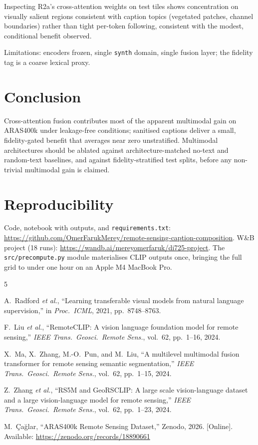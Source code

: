 \documentclass[conference]{IEEEtran}
\begin{document}
Inspecting R2a's cross-attention weights on test tiles shows
concentration on visually salient regions consistent with caption topics
(vegetated patches, channel boundaries) rather than tight per-token
following, consistent with the modest, conditional benefit observed.

Limitations: encoders frozen, single \texttt{synth} domain, single fusion
layer; the fidelity tag is a coarse lexical proxy.

\section{Conclusion}

Cross-attention fusion contributes most of the apparent multimodal gain
on ARAS400k under leakage-free conditions; sanitised captions deliver a
small, fidelity-gated benefit that averages near zero unstratified.
Multimodal architectures should be ablated against architecture-matched
no-text and random-text baselines, and against fidelity-stratified test
splits, before any non-trivial multimodal gain is claimed.

\section*{Reproducibility}

Code, notebook with outputs, and \texttt{requirements.txt}:
\url{https://github.com/OmerFarukMerey/remote-sensing-caption-composition}.
W\&B project (18 runs):
\url{https://wandb.ai/mereyomerfaruk/di725-project}. The
\texttt{src/precompute.py} module materialises CLIP outputs once,
bringing the full grid to under one hour on an Apple M4 MacBook Pro.

\begin{thebibliography}{5}

A.~Radford \emph{et al.}, ``Learning transferable visual models from natural
language supervision,'' in \emph{Proc.\ ICML}, 2021, pp.~8748--8763.

F.~Liu \emph{et al.}, ``RemoteCLIP: A vision language foundation model for
remote sensing,'' \emph{IEEE Trans.\ Geosci.\ Remote Sens.}, vol.~62,
pp.~1--16, 2024.

X.~Ma, X.~Zhang, M.-O.~Pun, and M.~Liu, ``A multilevel multimodal fusion
transformer for remote sensing semantic segmentation,''
\emph{IEEE Trans.\ Geosci.\ Remote Sens.}, vol.~62, pp.~1--15, 2024.

Z.~Zhang \emph{et al.}, ``RS5M and GeoRSCLIP: A large scale vision-language
dataset and a large vision-language model for remote sensing,''
\emph{IEEE Trans.\ Geosci.\ Remote Sens.}, vol.~62, pp.~1--23, 2024.

M.~\c{C}a\u{g}lar, ``ARAS400k Remote Sensing Dataset,'' Zenodo, 2026.
[Online]. Available: \url{https://zenodo.org/records/18890661}

\end{thebibliography}
\end{document}
